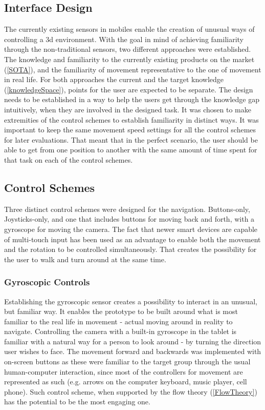 \subsection{Interface Design}
The currently existing sensors in mobiles enable the creation of unusual ways of controlling a 3d environment. With the goal in mind of achieving familiarity through the non-traditional sensors, two different approaches were established. The knowledge and familiarity to the currently existing products on the market (\ref{SOTA}), and the familiarity of movement representative to the one of movement in real life. For both approaches the current and the target knowledge (\ref{knowledgeSpace}), points for the user are expected to be separate. The design needs to be established in a way to help the users get through the knowledge gap intuitively, when they are involved in the designed task. It was chosen to make extremities of the control schemes to establish familiarity in distinct ways. It was important to keep the same movement speed settings for all the control schemes for later evaluations. That meant that in the perfect scenario, the user should be able to get from one position to another with the same amount of time spent for that task on each of the control schemes.

\subsection{Control Schemes}
Three distinct control schemes were designed for the navigation. Buttons-only, Joysticks-only, and one that includes buttons for moving back and forth, with a gyroscope for moving the camera. The fact that newer smart devices are capable of multi-touch input has been used as an advantage to enable both the movement and the rotation to be controlled simultaneously. That creates the possibility for the user to walk and turn around at the same time.

\subsubsection{Gyroscopic Controls}
Establishing the gyroscopic sensor creates a possibility to interact in an unusual, but familiar way. It enables the prototype to be built around what is most familiar to the real life in movement - actual moving around in reality to navigate.
Controlling the camera with a built-in gyroscope in the tablet is familiar with a natural way for a person to look around - by turning the direction user wishes to face. The movement forward and backwards was implemented with on-screen buttons as these were familiar to the target group through the usual human-computer interaction, since most of the controllers for movement are represented as such (e.g. arrows on the computer keyboard, music player, cell phone).
Such control scheme, when supported by the flow theory (\ref{FlowTheory}) has the potential to be the most engaging one.

